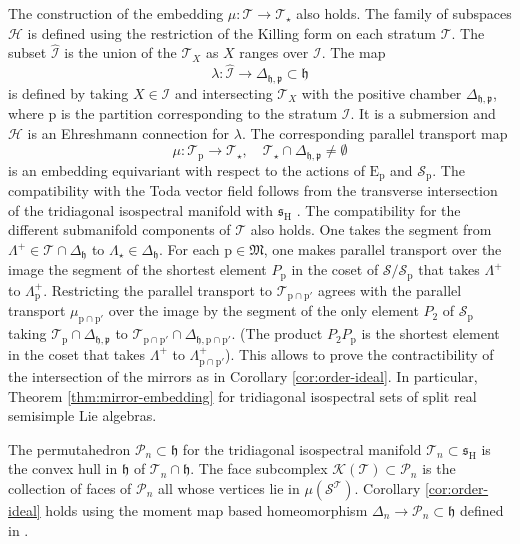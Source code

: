 \documentclass[reqno]{amsart}
\newcommand{\p}{\mathrm{p}}
\renewcommand{\gg}{\mathfrak{g}}
\newcommand{\hh}{\mathfrak{h}}
\renewcommand{\ss}{\mathfrak{s}}
\newcommand{\pp}{\mathfrak{p}}
\newcommand{\cH}{\mathcal{H}}
\newcommand{\cI}{\mathcal{I}}
\newcommand{\cP}{\mathcal{P}}
\newcommand{\cS}{\mathcal{S}}
\newcommand{\cT}{\mathcal{T}}
\newcommand{\E}{\mathrm{E}}
\renewcommand{\H}{\mathrm{H}}
\begin{document}
The construction of the embedding $\mu:\cT\to \cT_\star$ also holds. The family of subspaces $\cH$ is defined using the restriction of the Killing form on each stratum $\cT$.
The subset $\widehat{\cI}$ is the union of the $\cT_X$ as $X$ ranges over $\cI$. The map
\[\lambda:\widehat{\cI}\to \Delta_{\hh,\pp}\subset\hh\]
is defined by taking $X\in \cI$ and  intersecting $\cT_X$ with the positive chamber $\Delta_{\hh,\pp}$, where $\p$ is the partition corresponding to the stratum $\cI$. It is a submersion and $\cH$ is an Ehreshmann connection for $\lambda$. The corresponding parallel transport map
\[\mu:\cT_\p\to \cT_\star,\quad \cT_\star\cap \Delta_{\hh,\pp}\neq\emptyset\]
is an embedding equivariant with respect to the actions of $\E_\p$ and $\cS_{\p}$. The compatibility with the Toda vector field follows from the transverse intersection of the tridiagonal isospectral manifold with $\ss_\H$ \cite[Lemma 5]{MT}.
The compatibility for the different submanifold components of $\cT$ also holds. One takes the segment  from $\Lambda^+\in \cT\cap \Delta_\hh$ to $\Lambda_\star\in \Delta_\hh$. For each $\p\in \mathfrak{M}$, one makes parallel transport over the image the segment of the shortest element $P_\p$ in the coset of $\cS/\cS_{\p}$ that takes $\Lambda^+$ to $\Lambda^+_\p$. Restricting the parallel transport to $\cT_{\p\cap \p'}$  agrees with the parallel transport
$\mu_{\p\cap \p'}$ over the image by the segment of the only element $P_2$ of $\cS_{\p}$ taking $\cT_\p\cap \Delta_{\hh,\pp}$ to $\cT_{\p\cap \p'}\cap \Delta_{\hh,\p\cap \p'}$. (The product $P_2P_\p$ is the shortest element in the coset that takes $\Lambda^+$ to $\Lambda^+_{\p\cap \p'}$).
This allows to prove the contractibility of the intersection of the mirrors as in Corollary \ref{cor:order-ideal}. In particular,  Theorem \ref{thm:mirror-embedding} for  tridiagonal isospectral sets of split real semisimple Lie algebras.

 The permutahedron $\cP_n\subset \hh$ for the tridiagonal isospectral manifold $\cT_n\subset \ss_\H$ is the convex hull in $\hh$ of $\cT_n\cap \hh$. The face subcomplex $\mathcal{K}(\cT)\subset \cP_n$ is the collection of faces of $\cP_n$ all whose vertices lie in $\mu(\cS^\cT)$. Corollary \ref{cor:order-ideal} holds  using the moment map based homeomorphism $\Delta_n\longrightarrow \cP_n\subset \hh$ defined in \cite[Section 4.1]{BFR}.
\end{document}
